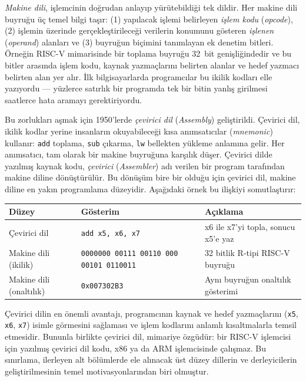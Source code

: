 \emph{Makine dili}, işlemcinin doğrudan anlayıp yürütebildiği tek dildir. Her makine dili buyruğu üç temel bilgi taşır: (1) yapılacak işlemi belirleyen \emph{işlem kodu} (\emph{opcode}), (2) işlemin üzerinde gerçekleştirileceği verilerin konumunu gösteren \emph{işlenen} (\emph{operand}) alanları ve (3) buyruğun biçimini tanımlayan ek denetim bitleri. Örneğin RISC-V mimarisinde bir toplama buyruğu 32~bit genişliğindedir ve bu bitler arasında işlem kodu, kaynak yazmaçlarını belirten alanlar ve hedef yazmacı belirten alan yer alır. İlk bilgisayarlarda programcılar bu ikilik kodları elle yazıyordu --- yüzlerce satırlık bir programda tek bir bitin yanlış girilmesi saatlerce hata aramayı gerektiriyordu.

Bu zorlukları aşmak için 1950'lerde \emph{çevirici dil} (\emph{Assembly}) geliştirildi. Çevirici dil, ikilik kodlar yerine insanların okuyabileceği kısa anımsatıcılar (\emph{mnemonic}) kullanır: \texttt{add} toplama, \texttt{sub} çıkarma, \texttt{lw} bellekten yükleme anlamına gelir. Her anımsatıcı, tam olarak bir makine buyruğuna karşılık düşer. Çevirici dilde yazılmış kaynak kodu, \emph{çevirici} (\emph{Assembler}) adı verilen bir program tarafından makine diline dönüştürülür. Bu dönüşüm bire bir olduğu için çevirici dil, makine diline en yakın programlama düzeyidir. Aşağıdaki örnek bu ilişkiyi somutlaştırır:

\begin{center}
\footnotesize
\begin{tabular}{@{}lll@{}}
\toprule
\textbf{Düzey} & \textbf{Gösterim} & \textbf{Açıklama} \\
\midrule
Çevirici dil & \texttt{add x5, x6, x7} & x6 ile x7'yi topla, sonucu x5'e yaz \\
Makine dili (ikilik) & \texttt{0000000\,00111\,00110\,000\,00101\,0110011} & 32 bitlik R-tipi RISC-V buyruğu \\
Makine dili (onaltılık) & \texttt{0x007302B3} & Aynı buyruğun onaltılık gösterimi \\
\bottomrule
\end{tabular}
\end{center}

Çevirici dilin en önemli avantajı, programcının kaynak ve hedef yazmaçlarını (\texttt{x5}, \texttt{x6}, \texttt{x7}) isimle görmesini sağlaması ve işlem kodlarını anlamlı kısaltmalarla temsil etmesidir. Bununla birlikte çevirici dil, mimariye özgüdür: bir RISC-V işlemcisi için yazılmış çevirici dil kodu, x86 ya da ARM işlemcisinde çalışmaz. Bu sınırlama, ilerleyen alt bölümlerde ele alınacak üst düzey dillerin ve derleyicilerin geliştirilmesinin temel motivasyonlarından biri olmuştur.

